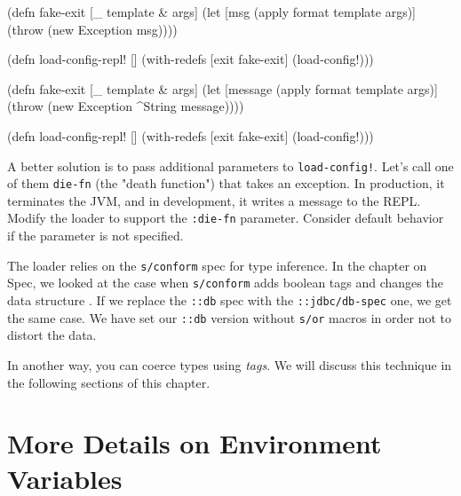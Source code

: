 \ifnarrow

\begin{english}
  \begin{clojure}
(defn fake-exit
  [_ template & args]
  (let [msg (apply format template args)]
    (throw (new Exception msg))))

(defn load-config-repl! []
  (with-redefs [exit fake-exit]
    (load-config!)))
  \end{clojure}
\end{english}

\else

\begin{english}
  \begin{clojure}
(defn fake-exit
  [_ template & args]
  (let [message (apply format template args)]
    (throw (new Exception ^String message))))

(defn load-config-repl! []
  (with-redefs [exit fake-exit]
    (load-config!)))
  \end{clojure}
\end{english}

\fi


A better solution is to pass additional parameters to \texttt{load-config!}. Let's call one of them \verb|die-fn| (the "death function") that takes an exception. In production, it terminates the JVM, and in development, it writes a message to the REPL. Modify the loader to support the \verb|:die-fn| parameter. Consider default behavior if the parameter is not specified.

The loader relies on the \verb|s/conform| spec for type inference. In the chapter on Spec, we looked at the case when \verb|s/conform| adds boolean tags and changes the data structure . If we replace the \verb|::db| spec with the \verb|::jdbc/db-spec| one, we get the same case. We have set our \verb|::db| version without \verb|s/or| macros in order not to distort the data.


In another way, you can coerce types using \emph{tags}. We will discuss this technique in the following sections of this chapter.

\section{More Details on Environment Variables}


